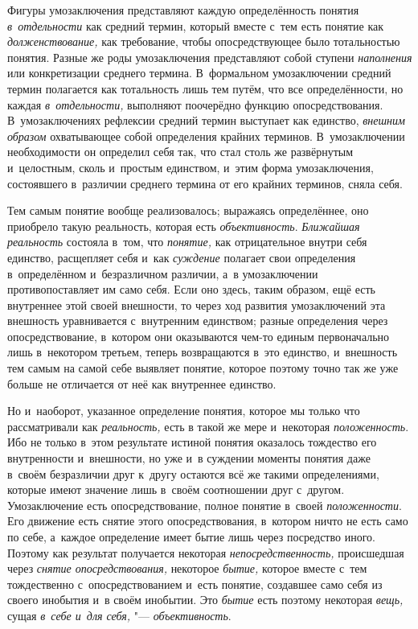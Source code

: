 Фигуры умозаключения представляют каждую определённость
понятия {\em в~отдельности}
как средний термин, который вместе с~тем есть понятие как
{\em долженствование,}
как требование, чтобы опосредствующее было тотальностью
понятия. Разные же роды умозаключения представляют собой ступени
{\em наполнения} или
конкретизации среднего термина. В~формальном умозаключении средний термин
полагается как тотальность лишь тем путём, что все определённости, но
каждая {\em в~отдельности,}
выполняют поочерёдно функцию опосредствования.
В~умозаключениях рефлексии средний термин выступает как единство,
{\em внешним образом} охватывающее собой определения крайних терминов.
В~умозаключении необходимости он определил себя так, что стал столь же
развёрнутым и~целостным, сколь и~простым единством, и~этим форма
умозаключения, состоявшего в~различии среднего термина от его крайних
терминов, сняла себя.

Тем самым понятие вообще реализовалось; выражаясь
определённее, оно приобрело такую реальность, которая есть
{\em объективность}. {\em Ближайшая реальность} состояла в~том, что
{\em понятие,} как отрицательное внутри себя единство, расщепляет себя и~как
{\em суждение} полагает
свои определения в~определённом и~безразличном различии, а~в умозаключении
противопоставляет им само себя. Если оно здесь, таким образом, ещё есть
внутреннее этой своей внешности, то через ход развития умозаключений эта
внешность уравнивается с~внутренним единством; разные определения через
опосредствование, в~котором они оказываются чем-то единым первоначально
лишь в~некотором третьем, теперь возвращаются в~это единство, и~внешность
тем самым на самой себе выявляет понятие, которое поэтому точно так же уже
больше не отличается от неё как внутреннее единство.

Но и~наоборот, указанное определение понятия, которое мы
только что рассматривали как {\em реальность,} есть в
такой же мере и~некоторая {\em положенность}. Ибо
не только в~этом результате истиной понятия оказалось тождество его
внутренности и~внешности, но уже и~в суждении моменты понятия даже в~своём
безразличии друг к~другу остаются всё же такими определениями, которые
имеют значение лишь в~своём соотношении друг с~другом. Умозаключение есть
опосредствование, полное понятие в~своей {\em положенности}. Его
движение есть снятие этого опосредствования, в~котором ничто не есть само
по себе, а~каждое определение имеет бытие лишь через посредство иного.
Поэтому как результат получается некоторая {\em непосредственность,}
происшедшая через {\em снятие опосредствования,} некоторое {\em бытие,}
которое вместе с~тем тождественно с~опосредствованием и~есть
понятие, создавшее само себя из своего инобытия и~в своём инобытии. Это
{\em бытие} есть поэтому некоторая {\em вещь,} сущая {\em в~себе и~для
себя,} "--- {\em объективность}.

